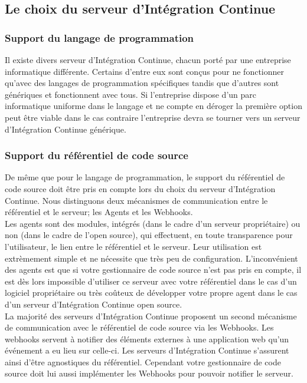     \subsection{Le choix du serveur d’Intégration Continue}

      \subsubsection{Support du langage de programmation}
      Il existe divers serveur d'Intégration Continue, chacun porté par une entreprise informatique différente. Certains d'entre eux sont conçus pour ne fonctionner qu'avec des langages de programmation spécifiques tandis que d'autres sont génériques et fonctionnent avec tous. Si l'entreprise dispose d'un parc informatique uniforme dans le langage et ne compte en déroger la première option peut être viable dans le cas contraire l'entreprise devra se tourner vers un serveur d'Intégration Continue générique.

      \subsubsection{Support du référentiel de code source}
      De même que pour le langage de programmation, le support du référentiel de code source doit être pris en compte lors du choix du serveur d'Intégration Continue. Nous distinguons deux mécanismes de communication entre le référentiel et le serveur; les Agents et les Webhooks.\\

      Les agents sont des modules, intégrés (dans le cadre d'un serveur propriétaire) ou non (dans le cadre de l'open source), qui effectuent, en toute transparence pour l'utilisateur, le lien entre le référentiel et le serveur. Leur utilisation est extrèmement simple et ne nécessite que très peu de configuration. L'inconvénient des agents est que si votre gestionnaire de code source n'est pas pris en compte, il est dès lors impossible d'utiliser ce serveur avec votre référentiel dans le cas d'un logiciel propriétaire ou très coûteux de développer votre propre agent dans le cas d'un serveur d'Intégration Continue open source.\\

      La majorité des serveurs d'Intégration Continue proposent un second mécanisme de communication avec le référentiel de code source via les Webhooks. Les webhooks servent à notifier des éléments externes à une application web qu'un événement a eu lieu sur celle-ci. Les serveurs d'Intégration Continue s'assurent ainsi d'être agnostiques du référentiel. Cependant votre gestionnaire de code source doit lui aussi implémenter les Webhooks pour pouvoir notifier le serveur.

